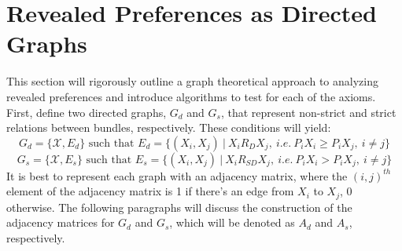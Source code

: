 \documentclass{article} %
\theoremstyle{style1}
\theoremstyle{style1}
\theoremstyle{example}
\begin{document}
\section{Revealed Preferences as Directed Graphs}\label{sec:rev_pref_as_digraph}

This section will rigorously outline a graph theoretical approach to analyzing revealed preferences and introduce algorithms to test for each of the axioms. First, define two directed graphs, $G_d$ and $G_s$, that represent non-strict and strict relations between bundles, respectively. These conditions will yield:
$$G_d=\{\mathcal{X},E_d\}\textrm{ such that }E_d=\{(X_i,X_j)\ |\ X_i R_D X_j,\ i.e.\ P_iX_i\geq P_iX_j,\ i\not=j\}$$
$$G_s=\{\mathcal{X},E_s\}\textrm{ such that }E_s=\{(X_i,X_j)\ |\ X_i R_{SD} X_j,\ i.e.\ P_iX_i> P_iX_j,\ i\not=j\}$$
It is best to represent each graph with an adjacency matrix, where the $(i,j)^{th}$ element of the adjacency matrix is 1 if there's an edge from $X_i$ to $X_j$, 0 otherwise. The following paragraphs will discuss the construction of the adjacency matrices for $G_d$ and $G_s$, which will be denoted as $A_d$ and $A_s$, respectively.
\end{document}
